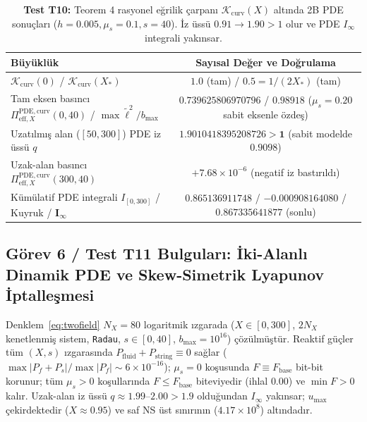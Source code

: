 \documentclass[12pt,a4paper]{article}
\begin{document}
\begin{table}[htbp]
\centering
\footnotesize
\setlength{\tabcolsep}{2pt}
\caption{\textbf{Test T10:} Teorem 4 rasyonel eğrilik çarpanı $\mathcal{K}_{\mathrm{curv}}(X)$ altında 2B PDE sonuçları ($h=0.005, \mu_s=0.1, s=40$). İz üssü $0.91 \to 1.90 > 1$ olur ve PDE $I_\infty$ integrali yakınsar.}
\vspace{0.1cm}
\begin{tabular}{@{}l|c@{}}
\hline
Büyüklük & Sayısal Değer ve Doğrulama \\
\hline
$\mathcal{K}_{\mathrm{curv}}(0)$ / $\mathcal{K}_{\mathrm{curv}}(X_*)$ & $1.0$ (tam) / $0.5 = 1/(2X_*)$ (tam) \\
\shortstack{Tam eksen basıncı \\ $\Pi_{\mathrm{eff}, X}^{\mathrm{PDE, curv}}(0, 40)$ / $\max \tilde{\ell}^2/b_{\max}$} & \shortstack{$0.739625806970796$ / $0.98918$ \\ ($\mu_s=0.20$ sabit eksenle özdeş)} \\
Uzatılmış alan ($[50, 300]$) PDE iz üssü $q$ & \shortstack{$\mathbf{1.9010418395208726 > 1}$ \\ (sabit modelde $0.9098$)} \\
Uzak-alan basıncı $\Pi_{\mathrm{eff}, X}^{\mathrm{PDE, curv}}(300, 40)$ & $+7.68\times 10^{-6}$ (negatif iz bastırıldı) \\
Kümülatif PDE integrali $I_{[0,300]}$ / Kuyruk / $\mathbf{I_\infty}$ & \shortstack{$0.865136911748$ / $-0.000908164080$ / \\ $\mathbf{0.867335641877}$ (sonlu)} \\
\hline
\end{tabular}
\end{table}

\subsection{Görev 6 / Test T11 Bulguları: İki-Alanlı Dinamik PDE ve Skew-Simetrik Lyapunov İptalleşmesi}

Denklem~\eqref{eq:twofield} $N_X = 80$ logaritmik ızgarada ($X \in [0, 300]$, $2 N_X$ kenetlenmiş sistem, \texttt{Radau}, $s \in [0, 40]$, $b_{\max} = 10^{16}$) çözülmüştür. Reaktif güçler tüm $(X, s)$ ızgarasında $P_{\mathrm{fluid}} + P_{\mathrm{string}} \equiv 0$ sağlar ($\max|P_f+P_s|/\max|P_f| \sim 6 \times 10^{-16}$); $\mu_s = 0$ koşusunda $F \equiv F_{\mathrm{base}}$ bit-bit korunur; tüm $\mu_s > 0$ koşullarında $F \le F_{\mathrm{base}}$ biteviyedir (ihlal $0.00$) ve $\min F > 0$ kalır. Uzak-alan iz üssü $q \approx 1.99\text{--}2.00 > 1.9$ olduğundan $I_\infty$ yakınsar; $u_{\max}$ çekirdektedir ($X \approx 0.95$) ve saf NS üst sınırının ($4.17 \times 10^8$) altındadır.
\end{document}

